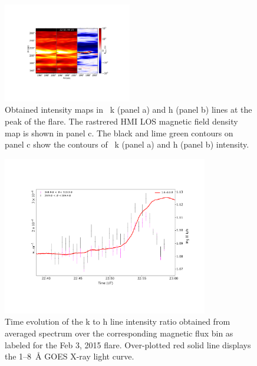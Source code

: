 \begin{figure}[ht!]
    \centering
\includegraphics[width=0.5\textwidth,trim={4cm 5cm 4cm 4cm},clip]{Figures/contour_paper_plot_feb-03-2015.pdf}
\caption{Obtained intensity maps in  ~k (panel a) and h (panel b) lines at the peak of the flare. The rastrered HMI LOS magnetic field density map is shown in panel c. The black and lime green contours on panel c show the contours of  ~k (panel a) and h (panel b) intensity.}
\label{fig:align_raster_flare3}
\end{figure}

\begin{figure}[ht!]
    \centering
    \includegraphics[trim={2cm 3cm 2cm 3cm},clip,width=0.8\textwidth]{Figures/Feb-04-2015-optical-dep-ev-2.pdf}
    \caption{Time evolution of the   k to h line intensity ratio obtained from averaged spectrum over the corresponding magnetic flux bin as labeled for the Feb 3, 2015 flare. Over-plotted red solid line displays the 1{--}8~{\AA} GOES X-ray light curve.}
    \label{fig:optical_dep_ev_c}
\end{figure}

